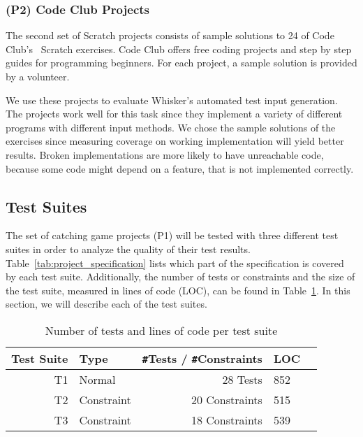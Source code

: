 \subsubsection{(P2) Code Club Projects}

The second set of Scratch projects consists of sample solutions to 24 of Code Club's~\cite{codeclub} Scratch exercises.
Code Club offers free coding projects and step by step guides for programming beginners.
For each project, a sample solution is provided by a volunteer.
\parspace

We use these projects to evaluate Whisker's automated test input generation.
The projects work well for this task since they implement a variety of different programs with different input methods.
We chose the sample solutions of the exercises since measuring coverage on working implementation will yield better results.
Broken implementations are more likely to have unreachable code,
because some code might depend on a feature, that is not implemented correctly.

\subsection{Test Suites}

The set of catching game projects (P1) will be tested with three different test suites
in order to analyze the quality of their test results.
Table~\ref{tab:project_specification} lists which part of the specification is covered by each test suite.
Additionally, the number of tests or constraints and the size of the test suite, measured in lines of code (LOC),
can be found in Table~\ref{tab:test_suite_statistics}.
In this section, we will describe each of the test suites.

\begin{table}[htpb]
    \centering
    \scriptsize
    \begin{tabular}{rlrlr}
        \toprule
        Test Suite & Type       & \texttt{\#}Tests / \texttt{\#}Constraints & LOC \\
        \midrule
        T1         & Normal     & 28 Tests                                  & 852 \\
        T2         & Constraint & 20 Constraints                            & 515 \\
        T3         & Constraint & 18 Constraints                            & 539 \\
        \bottomrule
    \end{tabular}
    \caption{Number of tests and lines of code per test suite}
    \label{tab:test_suite_statistics}
\end{table}

